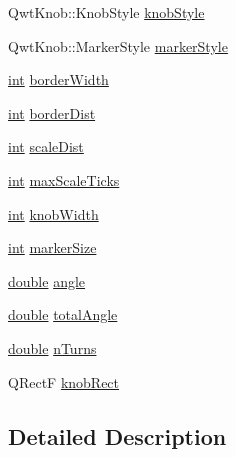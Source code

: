 \begin{DoxyCompactItemize}
\item 
Qwt\-Knob\-::\-Knob\-Style \hyperlink{class_qwt_knob_1_1_private_data_a07f2f845679c4cd3befad01dbed23380}{knob\-Style}
\item 
Qwt\-Knob\-::\-Marker\-Style \hyperlink{class_qwt_knob_1_1_private_data_a6a26015946d1dcdc996a5cfd31df6511}{marker\-Style}
\item 
\hyperlink{ioapi_8h_a787fa3cf048117ba7123753c1e74fcd6}{int} \hyperlink{class_qwt_knob_1_1_private_data_ac84e402d536349b01e115f8d6a4bf756}{border\-Width}
\item 
\hyperlink{ioapi_8h_a787fa3cf048117ba7123753c1e74fcd6}{int} \hyperlink{class_qwt_knob_1_1_private_data_ab63331084dcd0685264ce7751a5004e6}{border\-Dist}
\item 
\hyperlink{ioapi_8h_a787fa3cf048117ba7123753c1e74fcd6}{int} \hyperlink{class_qwt_knob_1_1_private_data_a6b114957cd7f390ab3dbbec9584c478e}{scale\-Dist}
\item 
\hyperlink{ioapi_8h_a787fa3cf048117ba7123753c1e74fcd6}{int} \hyperlink{class_qwt_knob_1_1_private_data_ac0d5d7e973fe89b326b2c2d85e4d2377}{max\-Scale\-Ticks}
\item 
\hyperlink{ioapi_8h_a787fa3cf048117ba7123753c1e74fcd6}{int} \hyperlink{class_qwt_knob_1_1_private_data_a7e3523b564c9bbd7f04c21a11afe9b02}{knob\-Width}
\item 
\hyperlink{ioapi_8h_a787fa3cf048117ba7123753c1e74fcd6}{int} \hyperlink{class_qwt_knob_1_1_private_data_aafdc01e15e29179204ef857ddfb684a5}{marker\-Size}
\item 
\hyperlink{_super_l_u_support_8h_a8956b2b9f49bf918deed98379d159ca7}{double} \hyperlink{class_qwt_knob_1_1_private_data_a2318c111292b07b523d26598530afbf8}{angle}
\item 
\hyperlink{_super_l_u_support_8h_a8956b2b9f49bf918deed98379d159ca7}{double} \hyperlink{class_qwt_knob_1_1_private_data_a5581c49be956d833c90b5998fcb4d641}{total\-Angle}
\item 
\hyperlink{_super_l_u_support_8h_a8956b2b9f49bf918deed98379d159ca7}{double} \hyperlink{class_qwt_knob_1_1_private_data_a812191d83dcb643c9f688ae81e97287e}{n\-Turns}
\item 
Q\-Rect\-F \hyperlink{class_qwt_knob_1_1_private_data_a313028569ba13a80cbe693731ee80842}{knob\-Rect}
\end{DoxyCompactItemize}


\subsection{Detailed Description}


